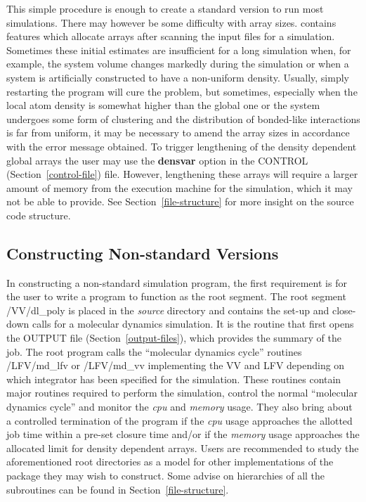 This simple procedure is enough to create a standard version to run
most simulations.  There may however be some difficulty with array
sizes.  \D contains features which allocate arrays after scanning
the input files for a simulation.  Sometimes these initial estimates
are insufficient for a long simulation when, for example, the system
volume changes markedly during the simulation or when a system is
artificially constructed to have a non-uniform density.  Usually,
simply restarting the program will cure the problem, but sometimes,
especially when the local atom density is somewhat higher than the
global one or the system undergoes some form of clustering and the
distribution of bonded-like interactions is far from uniform, it
may be necessary to amend the array sizes in accordance with the
error message obtained.  To trigger lengthening of the density
dependent global arrays the user may use the {\bf densvar} option in
the CONTROL (Section~\ref{control-file}) file.  However, lengthening
these arrays will require a larger amount of memory from the
execution machine for the simulation, which it may not be able to
provide.  See Section~\ref{file-structure} for more insight on the
\D source code structure.

\subsection{Constructing Non-standard Versions}

In constructing a non-standard \D simulation program, the first
requirement is for the user to write a program to function as the
root segment.  The root segment {\sc /VV/dl\_poly} is placed in the
{\em source} directory and contains the set-up and close-down calls
for a molecular dynamics simulation.  It is the routine that first
opens the OUTPUT file (Section~\ref{output-files}), which provides
the summary of the job.  The root program calls the ``molecular
dynamics cycle'' routines {\sc /LFV/md\_lfv} or {\sc /LFV/md\_vv}
implementing the VV and LFV depending on which integrator has been
specified for the simulation. These routines contain major routines
required to perform the simulation, control the normal ``molecular
dynamics cycle'' and monitor the {\em cpu} and {\em memory} usage.
They also bring about a controlled termination of the program if
the {\em cpu} usage approaches the allotted job time within a
pre-set closure time and/or if the {\em memory} usage approaches the
allocated limit for density dependent arrays.   Users are recommended
to study the aforementioned root directories as a model for other
implementations of the package they may wish to construct.  Some
advise on hierarchies of all the \D subroutines can be found in
Section~\ref{file-structure}.

